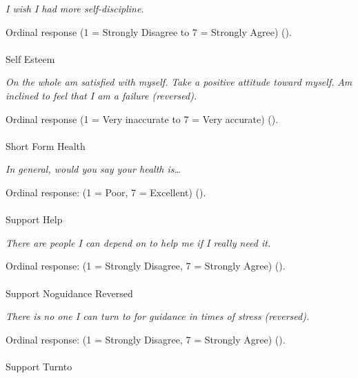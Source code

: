 \documentclass[
  single column]{article}
\makeatletter
\let\oldparagraph\paragraph
\renewcommand{\paragraph}{
    \@ifstar
      \xxxParagraphStar
      \xxxParagraphNoStar
  }
\newcommand{\xxxParagraphStar}[1]{\oldparagraph*{#1}\mbox{}}
\newcommand{\xxxParagraphNoStar}[1]{\oldparagraph{#1}\mbox{}}
\makeatother
\begin{document}
\emph{I wish I had more self-discipline.}

Ordinal response (1 = Strongly Disagree to 7 = Strongly Agree)
().

\paragraph{Self Esteem}\label{self-esteem}

\emph{On the whole am satisfied with myself.} \emph{Take a positive
attitude toward myself.} \emph{Am inclined to feel that I am a failure
(reversed).}

Ordinal response (1 = Very inaccurate to 7 = Very accurate)
().

\paragraph{Short Form Health}\label{short-form-health}

\emph{In general, would you say your health is\ldots{}}

Ordinal response: (1 = Poor, 7 = Excellent)
().

\paragraph{Support Help}\label{support-help}

\emph{There are people I can depend on to help me if I really need it.}

Ordinal response: (1 = Strongly Disagree, 7 = Strongly Agree)
().

\paragraph{Support Noguidance
Reversed}\label{support-noguidance-reversed}

\emph{There is no one I can turn to for guidance in times of stress
(reversed).}

Ordinal response: (1 = Strongly Disagree, 7 = Strongly Agree)
().

\paragraph{Support Turnto}\label{support-turnto}
\end{document}
